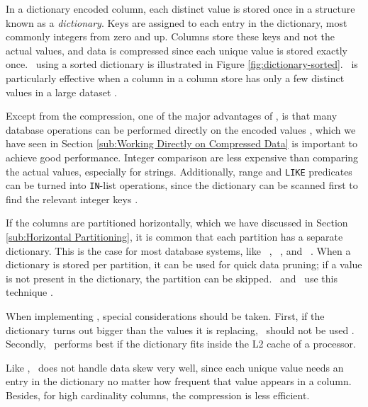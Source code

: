 
In a dictionary encoded column, each distinct value is stored once in a structure known as a \textit{dictionary}. Keys are assigned to each entry in the dictionary, most commonly integers from zero and up. Columns store these keys and not the actual values, and data is compressed since each unique value is stored exactly once. \de~using a sorted dictionary is illustrated in Figure \ref{fig:dictionary-sorted}. \de~is particularly effective when a column in a column store has only a few distinct values in a large dataset \cite{Faust2015-ke}.


Except from the compression, one of the major advantages of \de, is that many database operations can be performed directly on the encoded values \cite{Faust2015-ke}, which we have seen in Section \ref{sub:Working Directly on Compressed Data} is important to achieve good performance. Integer comparison are less expensive than comparing the actual values, especially for strings. Additionally, range and \texttt{LIKE} predicates can be turned into \texttt{IN}-list operations, since the dictionary can be scanned first to find the relevant integer keys \cite{Barber2012-xt}.

If the columns are partitioned horizontally, which we have discussed in Section \ref{sub:Horizontal Partitioning}, it is common that each partition has a separate dictionary. This is the case for most database systems, like \oracle~\cite{Lahiri2015-mz}, \blink~\cite{Barber2012-xt}, and \mssql~\cite{Larson2013-mc}. When a dictionary is stored per partition, it can be used for quick data pruning; if a value is not present in the dictionary, the partition can be skipped. \blink~and \monetx~use this technique \cite{Barber2012-xt, Boncz2005-wj}. 

When implementing \de, special considerations should be taken. First, if the dictionary turns out bigger than the values it is replacing, \de~should not be used \cite{Holloway2008-rr}. Secondly, \de~performs best if the dictionary fits inside the L2 cache of a processor.

Like \bp, \de~does not handle data skew very well, since each unique value needs an entry in the dictionary no matter how frequent that value appears in a column. Besides, for high cardinality columns, the compression is less efficient.

